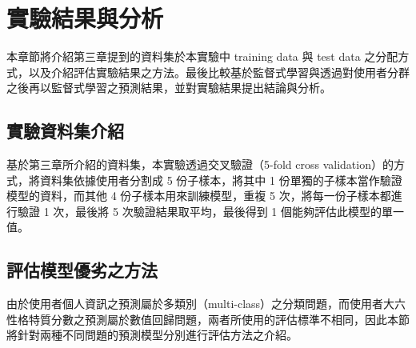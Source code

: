 \chapter{實驗結果與分析}
{
本章節將介紹第三章提到的資料集於本實驗中 training data 與 test data 之分配方式，以及介紹評估實驗結果之方法。最後比較基於監督式學習與透過對使用者分群之後再以監督式學習之預測結果，並對實驗結果提出結論與分析。
}

\section{實驗資料集介紹}
{
基於第三章所介紹的資料集，本實驗透過交叉驗證（5-fold cross validation）的方式，將資料集依據使用者分割成 5 份子樣本，將其中 1 份單獨的子樣本當作驗證模型的資料，而其他 4 份子樣本用來訓練模型，重複 5 次，將每一份子樣本都進行驗證 1 次，最後將 5 次驗證結果取平均，最後得到 1 個能夠評估此模型的單一值。


}

\section{評估模型優劣之方法}
{
由於使用者個人資訊之預測屬於多類別（multi-class）之分類問題，而使用者大六性格特質分數之預測屬於數值回歸問題，兩者所使用的評估標準不相同，因此本節將針對兩種不同問題的預測模型分別進行評估方法之介紹。


}

